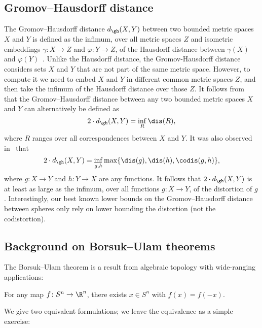 \documentclass[11pt, reqno, english]{amsart}
\begin{document}
\subsection*{Gromov--Hausdorff distance}

The Gromov--Hausdorff distance $d_{\gh}(X,Y)$ between two bounded metric spaces $X$ and $Y$ is defined as the infimum, over all metric spaces $Z$ and isometric embeddings $\gamma\colon X\to Z$ and $\varphi\colon Y\to Z$, of the Hausdorff distance between $\gamma(X)$ and $\varphi(Y)$~\cite{edwards1975structure,gromov2007metric}.
Unlike the Hausdorff distance, the Gromov-Hausdorff distance considers sets $X$ and $Y$ that are not part of the same metric space.
However, to compute it we need to embed $X$ and $Y$ in different common metric spaces $Z$, and then take the infimum of the Hausdorff distance over those $Z$.
It follows from~\cite{kalton1999distances} that the Gromov--Hausdorff distance between any two bounded metric spaces $X$ and $Y$ can alternatively be defined as
\[2\cdot d_{\gh}(X,Y) = \inf_{R}\dis(R),\]
where $R$ ranges over all correspondences between $X$ and $Y$.
It was also observed in~\cite{kalton1999distances} that
\begin{equation}
\label{eq:dgh}
2\cdot d_{\gh}(X,Y) = \inf_{g,h}\max\{\dis(g),\dis(h),\codis(g,h)\},\end{equation}
where $g\colon X \to Y$ and $h\colon Y \to X$ are any functions.
It follows that $2\cdot d_{\gh}(X,Y)$ is at least as large as the infimum, over all functions $g\colon X\to Y$, of the distortion of $g$.
Interestingly, our best known lower bounds on the Gromov--Hausdorff distance between spheres only rely on lower bounding the distortion (not the codistortion).


\subsection{Background on Borsuk--Ulam theorems}
\label{ssec:background-bu}

The Borsuk--Ulam theorem is a result from algebraic topology with wide-ranging applications:

\begin{theorem}
\label{thm:borsuk-ulam}
For any map $f \colon S^{n} \to \R^{n}$, there exists $x \in S^{n}$ with $f(x) = f(-x)$.
\end{theorem}

We give two equivalent formulations; we leave the equivalence as a simple exercise:
\end{document}
